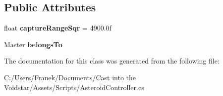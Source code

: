 \subsection*{Public Attributes}
\begin{DoxyCompactItemize}
\item 
\hypertarget{class_asteroid_controller_a1a82623f0a5fbab9d9abf8608c2db739}{}float {\bfseries capture\+Range\+Sqr} = 4900.\+0f\label{class_asteroid_controller_a1a82623f0a5fbab9d9abf8608c2db739}

\item 
\hypertarget{class_asteroid_controller_a5980b7670033334fe07315a63540d192}{}Master {\bfseries belongs\+To}\label{class_asteroid_controller_a5980b7670033334fe07315a63540d192}

\end{DoxyCompactItemize}


The documentation for this class was generated from the following file\+:\begin{DoxyCompactItemize}
\item 
C\+:/\+Users/\+Franek/\+Documents/\+Cast into the Voidstar/\+Assets/\+Scripts/Asteroid\+Controller.\+cs\end{DoxyCompactItemize}
